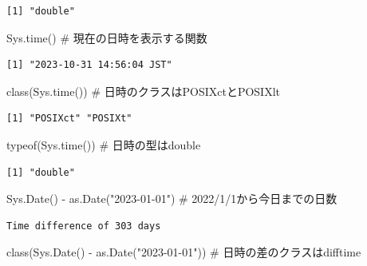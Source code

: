 \documentclass[
  letterpaper,
  DIV=11,
  numbers=noendperiod]{scrreprt}
\newenvironment{Shaded}{\begin{snugshade}}{\end{snugshade}}
\newcommand{\CommentTok}[1]{\textcolor[rgb]{0.37,0.37,0.37}{#1}}
\newcommand{\FunctionTok}[1]{\textcolor[rgb]{0.28,0.35,0.67}{#1}}
\newcommand{\NormalTok}[1]{\textcolor[rgb]{0.00,0.23,0.31}{#1}}
\newcommand{\SpecialCharTok}[1]{\textcolor[rgb]{0.37,0.37,0.37}{#1}}
\newcommand{\StringTok}[1]{\textcolor[rgb]{0.13,0.47,0.30}{#1}}
\begin{document}
\begin{verbatim}
[1] "double"
\end{verbatim}

\begin{Shaded}
\begin{Highlighting}[]
\FunctionTok{Sys.time}\NormalTok{() }\CommentTok{\# 現在の日時を表示する関数}
\end{Highlighting}
\end{Shaded}

\begin{verbatim}
[1] "2023-10-31 14:56:04 JST"
\end{verbatim}

\begin{Shaded}
\begin{Highlighting}[]
\FunctionTok{class}\NormalTok{(}\FunctionTok{Sys.time}\NormalTok{()) }\CommentTok{\# 日時のクラスはPOSIXctとPOSIXlt}
\end{Highlighting}
\end{Shaded}

\begin{verbatim}
[1] "POSIXct" "POSIXt" 
\end{verbatim}

\begin{Shaded}
\begin{Highlighting}[]
\FunctionTok{typeof}\NormalTok{(}\FunctionTok{Sys.time}\NormalTok{()) }\CommentTok{\# 日時の型はdouble}
\end{Highlighting}
\end{Shaded}

\begin{verbatim}
[1] "double"
\end{verbatim}

\begin{Shaded}
\begin{Highlighting}[]
\FunctionTok{Sys.Date}\NormalTok{() }\SpecialCharTok{{-}} \FunctionTok{as.Date}\NormalTok{(}\StringTok{"2023{-}01{-}01"}\NormalTok{) }\CommentTok{\# 2022/1/1から今日までの日数}
\end{Highlighting}
\end{Shaded}

\begin{verbatim}
Time difference of 303 days
\end{verbatim}

\begin{Shaded}
\begin{Highlighting}[]
\FunctionTok{class}\NormalTok{(}\FunctionTok{Sys.Date}\NormalTok{() }\SpecialCharTok{{-}} \FunctionTok{as.Date}\NormalTok{(}\StringTok{"2023{-}01{-}01"}\NormalTok{)) }\CommentTok{\# 日時の差のクラスはdifftime}
\end{Highlighting}
\end{Shaded}
\end{document}
